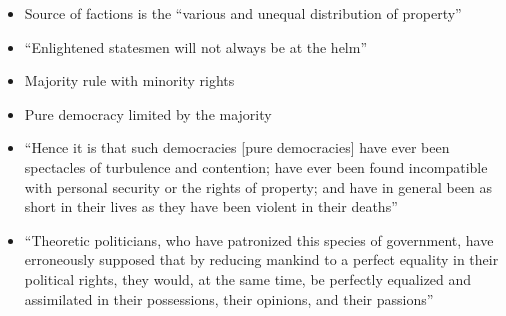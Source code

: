 \documentclass[12pt]{article}
\begin{document}
\begin{itemize}
\begin{itemize}
      \item Source of factions is the “various and unequal distribution of property”

      \item “Enlightened statesmen will not always be at the helm”

      \item Majority rule with minority rights

      \item Pure democracy limited by the majority

      \item “Hence it is that such democracies [pure democracies] have ever been spectacles of turbulence and contention; have ever been found incompatible with personal security or the rights of property; and have in general been as short in their lives as they have been violent in their deaths”

      \item “Theoretic politicians, who have patronized this species of government, have erroneously supposed that by reducing mankind to a perfect equality in their political rights, they would, at the same time, be perfectly equalized and assimilated in their possessions, their opinions, and their passions”

    \end{itemize}

\end{itemize}
\end{document}
